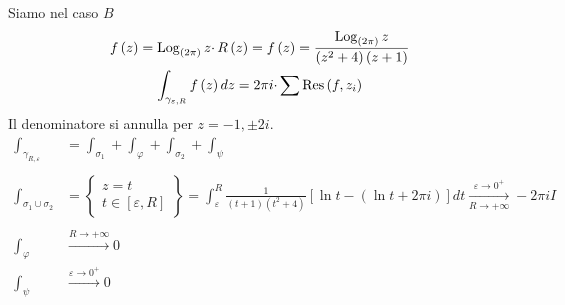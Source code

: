 Siamo nel caso $B$
\begin{gather*}
f\left( z\right) =\operatorname{Log}_{\left( 2\pi \right)} z\cdotp R\left( z\right) =f\left( z\right) =\frac{\operatorname{Log}_{\left( 2\pi \right)} z}{\left( z^{2} +4\right)\left( z+1\right)}\\
\int _{\gamma _{\varepsilon ,R}} f\left( z\right) dz=2\pi i\cdotp \sum \operatorname{Res} \left( f,z_{i}\right)
\end{gather*}
Il denominatore si annulla per $z=-1,\pm 2i$.
\begin{equation*}
\begin{aligned}
\int _{\gamma _{R,\varepsilon }} & =\int _{\sigma _{1}} +\int _{\varphi } +\int _{\sigma _{2}} +\int _{\psi }\\
 & \\
\int _{\sigma _{1} \cup \sigma _{2}} & =\left\{\begin{array}{ c }
z=t\\
t\in \left[ \varepsilon ,R\right]
\end{array}\right\} =\int ^{R}_{\varepsilon }\frac{1}{\left( t+1\right)\left( t^{2} +4\right)}\left[\ln t-\left(\ln t+2\pi i\right)\right] dt\xrightarrow[R\rightarrow +\infty ]{\varepsilon \rightarrow 0^{+}} -2\pi iI\\
 & \\
\int _{\varphi } & \xrightarrow{R\rightarrow +\infty } 0\\
\int _{\psi } & \xrightarrow{\varepsilon \rightarrow 0^{+}} 0
\end{aligned}
\end{equation*}
\Soluzione


